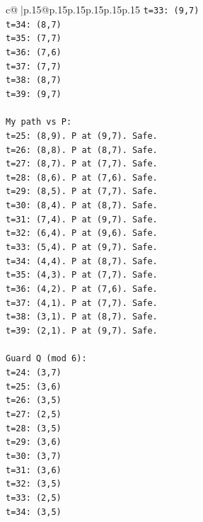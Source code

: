 \documentclass{article}
\begin{document}
{\begin{supertabular}{c@{$\;$}|p{.15\linewidth}@{}p{.15\linewidth}p{.15\linewidth}p{.15\linewidth}p{.15\linewidth}p{.15\linewidth}}
{{{\texttt{t=33: (9,7)} \\
\texttt{t=34: (8,7)} \\
\texttt{t=35: (7,7)} \\
\texttt{t=36: (7,6)} \\
\texttt{t=37: (7,7)} \\
\texttt{t=38: (8,7)} \\
\texttt{t=39: (9,7)} \\
\\ 
\texttt{My path vs P:} \\
\texttt{t=25: (8,9). P at (9,7). Safe.} \\
\texttt{t=26: (8,8). P at (8,7). Safe.} \\
\texttt{t=27: (8,7). P at (7,7). Safe.} \\
\texttt{t=28: (8,6). P at (7,6). Safe.} \\
\texttt{t=29: (8,5). P at (7,7). Safe.} \\
\texttt{t=30: (8,4). P at (8,7). Safe.} \\
\texttt{t=31: (7,4). P at (9,7). Safe.} \\
\texttt{t=32: (6,4). P at (9,6). Safe.} \\
\texttt{t=33: (5,4). P at (9,7). Safe.} \\
\texttt{t=34: (4,4). P at (8,7). Safe.} \\
\texttt{t=35: (4,3). P at (7,7). Safe.} \\
\texttt{t=36: (4,2). P at (7,6). Safe.} \\
\texttt{t=37: (4,1). P at (7,7). Safe.} \\
\texttt{t=38: (3,1). P at (8,7). Safe.} \\
\texttt{t=39: (2,1). P at (9,7). Safe.} \\
\\ 
\texttt{Guard Q (mod 6):} \\
\texttt{t=24: (3,7)} \\
\texttt{t=25: (3,6)} \\
\texttt{t=26: (3,5)} \\
\texttt{t=27: (2,5)} \\
\texttt{t=28: (3,5)} \\
\texttt{t=29: (3,6)} \\
\texttt{t=30: (3,7)} \\
\texttt{t=31: (3,6)} \\
\texttt{t=32: (3,5)} \\
\texttt{t=33: (2,5)} \\
\texttt{t=34: (3,5)} \\
}}}
\end{supertabular}}
\end{document}
